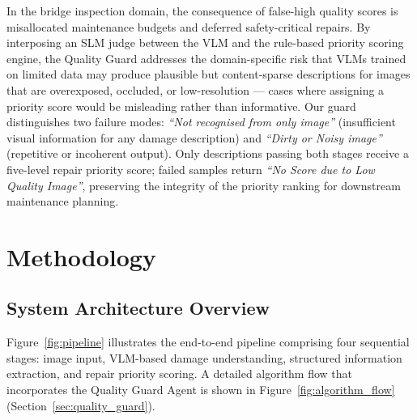 \documentclass[twocolumn]{article}
\begin{document}
In the bridge inspection domain, the consequence of false-high quality
scores is misallocated maintenance budgets and deferred safety-critical
repairs.
By interposing an SLM judge between the VLM and the rule-based priority
scoring engine, the Quality Guard addresses the domain-specific risk that
VLMs trained on limited data may produce plausible but content-sparse
descriptions for images that are overexposed, occluded, or
low-resolution --- cases where assigning a priority score would be
misleading rather than informative.
Our guard distinguishes two failure modes: \textit{``Not recognised from
only image''} (insufficient visual information for any damage
description) and \textit{``Dirty or Noisy image''} (repetitive or
incoherent output). Only descriptions passing both stages receive a
five-level repair priority score; failed samples return
\textit{``No Score due to Low Quality Image''}, preserving the
integrity of the priority ranking for downstream maintenance planning.

\section{Methodology}
\label{sec:methodology}

\subsection{System Architecture Overview}

Figure~\ref{fig:pipeline} illustrates the end-to-end pipeline comprising four
sequential stages: image input, VLM-based damage understanding, structured
information extraction, and repair priority scoring.
A detailed algorithm flow that incorporates the Quality Guard Agent
is shown in Figure~\ref{fig:algorithm_flow} (Section~\ref{sec:quality_guard}).
\end{document}
